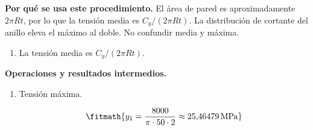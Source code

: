 \noindent\textbf{Por qué se usa este procedimiento.} El área de pared es aproximadamente $2\pi Rt$, por lo que la tensión media es $C_y/(2\pi Rt)$. La distribución de cortante del anillo eleva el máximo al doble. No confundir media y máxima.

\begin{enumerate}

\item La tensión media es $C_y/(2\pi R t)$.

\end{enumerate}

\noindent\textbf{Operaciones y resultados intermedios.}

\begin{enumerate}

\item Tensión máxima.

\[\fitmath{y_{1}=\frac{8000}{\pi\cdot 50\cdot 2}\approx 25{,}46479\,\mathrm{MPa}}\]

\end{enumerate}
